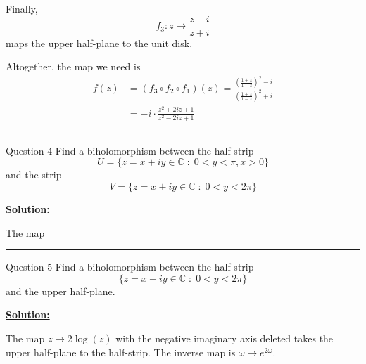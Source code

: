 \documentclass{article}
\newcommand{\C}{\mathbb{C}}
\begin{document}
Finally, 
\[ f_3 : z \mapsto \frac{z-i}{z+i} \] maps the upper half-plane to the unit disk. 

Altogether, the map we need is 
\begin{align*}
  f(z) &= (f_3 \circ f_2 \circ f_1) (z) = \frac{\left(\frac{1+z}{1-z}\right)^2 - i}{\left(\frac{1+z}{1-z}\right)^2 + i} \\
  &= -i \cdot \frac{z^2 + 2iz + 1}{z^2 - 2iz + 1}
\end{align*}

\vskip 0.5cm
\hrule 
\vskip 0.5cm



\begin{mathdefinitionbox}{Question 4}
\vskip 0.5cm
Find a biholomorphism between the half-strip \[ U = \{ z = x + iy \in \C \;:\; 0 < y < \pi, x > 0 \}   \] and the strip \[ V = \{ z  = x + iy \in \C \;:\; 0 < y < 2\pi \}  \]
\end{mathdefinitionbox}

\vskip 0.5cm
\underline{\textbf{Solution:}}

The map 

\vskip 0.5cm
\hrule 
\vskip 0.5cm



\begin{mathdefinitionbox}{Question 5}
\vskip 0.5cm
Find a biholomorphism between the half-strip \[ \{ z = x + iy \in \C \;:\; 0 < y < 2\pi \}   \] and the upper half-plane.
\end{mathdefinitionbox}

\vskip 0.5cm
\underline{\textbf{Solution:}}




The map $z \mapsto 2\log(z)$ with the negative imaginary axis deleted takes the upper half-plane to the half-strip. The inverse map is $\omega \mapsto e^{2\omega}$.
\end{document}
